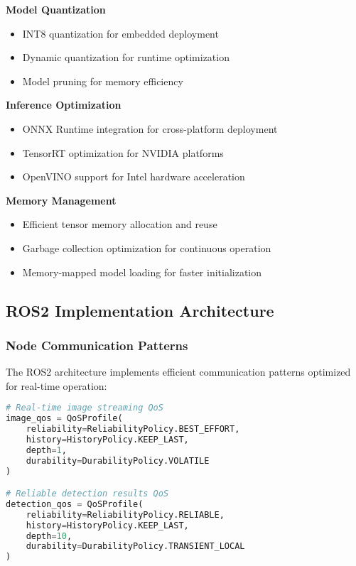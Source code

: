 \documentclass[12pt,a4paper]{article}
\begin{document}
\textbf{Model Quantization}
\begin{itemize}
    \item INT8 quantization for embedded deployment
    \item Dynamic quantization for runtime optimization
    \item Model pruning for memory efficiency
\end{itemize}

\textbf{Inference Optimization}
\begin{itemize}
    \item ONNX Runtime integration for cross-platform deployment
    \item TensorRT optimization for NVIDIA platforms
    \item OpenVINO support for Intel hardware acceleration
\end{itemize}

\textbf{Memory Management}
\begin{itemize}
    \item Efficient tensor memory allocation and reuse
    \item Garbage collection optimization for continuous operation
    \item Memory-mapped model loading for faster initialization
\end{itemize}

\subsection{ROS2 Implementation Architecture}

\subsubsection{Node Communication Patterns}

The ROS2 architecture implements efficient communication patterns optimized for real-time operation:

\begin{lstlisting}[language=Python, caption=Optimized QoS Configuration]
# Real-time image streaming QoS
image_qos = QoSProfile(
    reliability=ReliabilityPolicy.BEST_EFFORT,
    history=HistoryPolicy.KEEP_LAST,
    depth=1,
    durability=DurabilityPolicy.VOLATILE
)

# Reliable detection results QoS
detection_qos = QoSProfile(
    reliability=ReliabilityPolicy.RELIABLE,
    history=HistoryPolicy.KEEP_LAST,
    depth=10,
    durability=DurabilityPolicy.TRANSIENT_LOCAL
)
\end{lstlisting}
\end{document}
